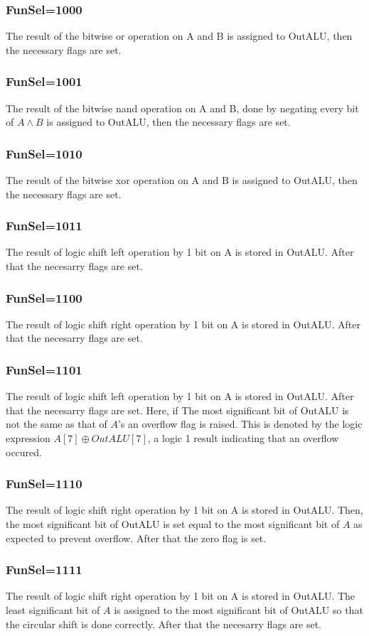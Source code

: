 \documentclass[pdftex,12pt,a4paper]{article}
\begin{document}
\subsubsection{FunSel=1000}
The result of the bitwise or operation on A and B is assigned to OutALU, then the necessary flags are set. 
\subsubsection{FunSel=1001}
The result of the bitwise nand operation on A and B, done by negating every bit of $A\land B$ is assigned to OutALU, then the 
necessary flags are set. 
\subsubsection{FunSel=1010}
The result of the bitwise xor operation on A and B is assigned to OutALU, then the necessary flags are set. 
\subsubsection{FunSel=1011}
The result of logic shift left operation by 1 bit on A is stored in OutALU. After that the necesarry flags are set. 
\subsubsection{FunSel=1100}
The result of logic shift right operation by 1 bit on A is stored in OutALU. After that the necesarry flags are set. 
\subsubsection{FunSel=1101}
The result of logic shift left operation by 1 bit on A is stored in OutALU. After that the necesarry flags are set.
\newline
Here, if The most significant bit of OutALU is not the same as that of $A$'s an overflow flag is raised. This is denoted by the logic
expression $A[7]\oplus{OutALU[7]}$, a logic 1 result indicating that an overflow occured.
\subsubsection{FunSel=1110}
The result of logic shift right operation by 1 bit on A is stored in OutALU. Then, the most significant bit of OutALU is set 
equal to the most significant bit of $A$ as expected to prevent overflow. After that the zero flag is set.
\subsubsection{FunSel=1111}
The result of logic shift right operation by 1 bit on A is stored in OutALU. The least significant bit of $A$ is assigned to the 
most significant bit of OutALU so that the circular shift is done correctly. After that the necesarry flags are set. 
\end{document}
